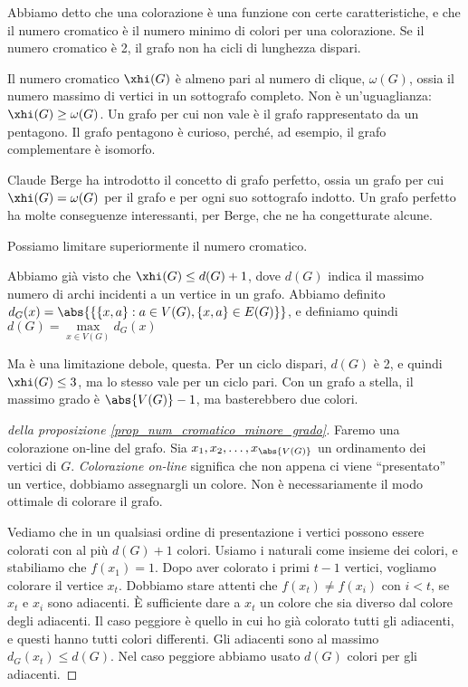 	Abbiamo detto che una colorazione \`e una funzione con certe caratteristiche, e che il numero cromatico \`e il numero minimo di colori per una colorazione.
	Se il numero cromatico \`e 2, il grafo non ha cicli di lunghezza dispari.

	Il numero cromatico $\xhi(G)$ \`e almeno pari al numero di clique, $\omega(G)$, ossia il numero massimo di vertici in un sottografo completo.
	Non \`e un'uguaglianza: $\xhi(G) \ge \omega(G)$.
	Un grafo per cui non vale \`e il grafo rappresentato da un pentagono.
	Il grafo pentagono \`e curioso, perch\'e, ad esempio, il grafo complementare \`e isomorfo.


	Claude Berge ha introdotto il concetto di grafo perfetto, ossia un grafo per cui $\xhi(G) = \omega(G)$ per il grafo e per ogni suo sottografo indotto.
	Un grafo perfetto ha molte conseguenze interessanti, per Berge, che ne ha congetturate alcune.

	Possiamo limitare superiormente il numero cromatico.
	\begin{prop}
		\label{prop_num_cromatico_minore_grado}
		Abbiamo gi\`a visto che $\xhi(G) \le d(G) + 1$, dove $d(G)$ indica il massimo numero di archi incidenti a un vertice in un grafo.
		Abbiamo definito $d_G(x) = \abs{\{ \{x,a\} : a \in V(G), \{x,a\} \in E(G) \}}$, e definiamo quindi $d(G) = \max\limits_{x \in V(G)} d_G(x)$
	\end{prop}
	Ma \`e una limitazione debole, questa.
	Per un ciclo dispari, $d(G)$ \`e 2, e quindi $\xhi(G) \le 3$, ma lo stesso vale per un ciclo pari.
	Con un grafo a stella, il massimo grado \`e $\abs{V(G)} - 1$, ma basterebbero due colori.

	\begin{proof}[della proposizione \ref{prop_num_cromatico_minore_grado}]
		Faremo una colorazione on-line del grafo.
		Sia $x_1, x_2, \dots, x_{\abs{V(G)}}$ un ordinamento dei vertici di $G$.
		\emph{Colorazione on-line} significa che non appena ci viene ``presentato'' un vertice, dobbiamo assegnargli un colore.
		Non \`e necessariamente il modo ottimale di colorare il grafo.

		Vediamo che in un qualsiasi ordine di presentazione i vertici possono essere colorati con al pi\`u $d(G) + 1$ colori.
		Usiamo i naturali come insieme dei colori, e stabiliamo che $f(x_1) = 1$.
		Dopo aver colorato i primi $t-1$ vertici, vogliamo colorare il vertice $x_t$.
		Dobbiamo stare attenti che $f(x_t) \neq f(x_i)$ con $i < t$, se $x_t$ e $x_i$ sono adiacenti.
		\`E sufficiente dare a $x_t$ un colore che sia diverso dal colore degli adiacenti.
		Il caso peggiore \`e quello in cui ho gi\`a colorato tutti gli adiacenti, e questi hanno tutti colori differenti.
		Gli adiacenti sono al massimo $d_G(x_t) \le d(G)$.
		Nel caso peggiore abbiamo usato $d(G)$ colori per gli adiacenti.
	\end{proof}

